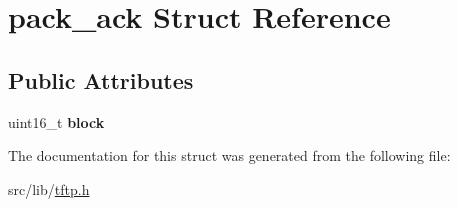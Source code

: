 \hypertarget{structpack__ack}{}\section{pack\+\_\+ack Struct Reference}
\label{structpack__ack}
\subsection*{Public Attributes}
\begin{DoxyCompactItemize}
\item 
uint16\+\_\+t {\bfseries block}\hypertarget{structpack__ack_afa1589b04941d35081b8c4577103a23c}{}\label{structpack__ack_afa1589b04941d35081b8c4577103a23c}

\end{DoxyCompactItemize}


The documentation for this struct was generated from the following file\+:\begin{DoxyCompactItemize}
\item 
src/lib/\hyperlink{tftp_8h}{tftp.\+h}\end{DoxyCompactItemize}

